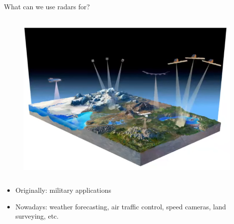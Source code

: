 \begin{columnframe}{What can we use radars for?}
    \begin{column}{0.5\textwidth}
        \begin{figure}
            \centering
            \includegraphics[width=\textwidth]{images/satellite_demo.png}
        \end{figure}
    \end{column}
    \begin{column}{0.5\textwidth}
        \begin{itemize}
            \item Originally: military applications
            \item Nowadays: weather forecasting, air traffic control, speed cameras, land surveying, etc.
        \end{itemize}
    \end{column}
\end{columnframe}




